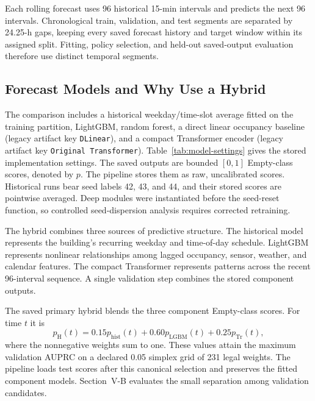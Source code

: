

Each rolling forecast uses 96 historical 15-min intervals and predicts the next 96 intervals. Chronological train, validation, and test segments are separated by 24.25-h gaps, keeping every saved forecast history and target window within its assigned split. Fitting, policy selection, and held-out saved-output evaluation therefore use distinct temporal segments.

\subsection{Forecast Models and Why Use a Hybrid}

The comparison includes a historical weekday/time-slot average fitted on the training partition, LightGBM, random forest, a direct linear occupancy baseline (legacy artifact key \texttt{DLinear}), and a compact Transformer encoder (legacy artifact key \texttt{Original Transformer}). Table~\ref{tab:model-settings} gives the stored implementation settings. The saved outputs are bounded $[0,1]$ Empty-class scores, denoted by $p$. The pipeline stores them as raw, uncalibrated scores. Historical runs bear seed labels 42, 43, and 44, and their stored scores are pointwise averaged. Deep modules were instantiated before the seed-reset function, so controlled seed-dispersion analysis requires corrected retraining.

The hybrid combines three sources of predictive structure. The historical model represents the building's recurring weekday and time-of-day schedule. LightGBM represents nonlinear relationships among lagged occupancy, sensor, weather, and calendar features. The compact Transformer represents patterns across the recent 96-interval sequence. A single validation step combines the stored component outputs.

The saved primary hybrid blends the three component Empty-class scores. For time $t$ it is
\begin{equation}
p_{\mathrm{H}}(t)=0.15p_{\mathrm{hist}}(t)+0.60p_{\mathrm{LGBM}}(t)+0.25p_{\mathrm{Tr}}(t),
\label{eq:blend}
\end{equation}
where the nonnegative weights sum to one. These values attain the maximum validation AUPRC on a declared 0.05 simplex grid of 231 legal weights. The pipeline loads test scores after this canonical selection and preserves the fitted component models. Section~V-B evaluates the small separation among validation candidates.

